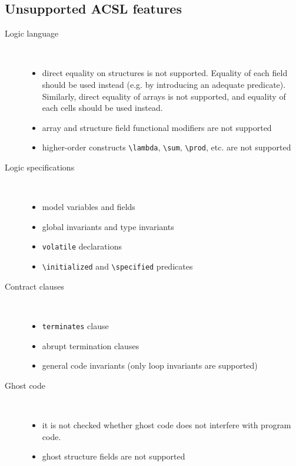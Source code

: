 \documentclass[a4paper,11pt,twoside,openright]{report}
\begin{document}
\subsection{Unsupported ACSL features}

\begin{description}
\item[Logic language] ~\\
  \begin{itemize}
  \item direct equality on structures is not supported. Equality of
    each field should be used instead (e.g. by introducing an adequate
    predicate). Similarly, direct equality of arrays is not supported,
    and equality of each cells should be used instead.
  \item array and structure field functional modifiers are not supported
  \item higher-order constructs \verb|\lambda|, \verb|\sum|,
    \verb|\prod|, etc. are not supported
  \end{itemize}
\item[Logic specifications] ~\\
  \begin{itemize}
  \item model variables and fields
  \item global invariants and type invariants
  \item \verb|volatile| declarations
  \item \verb|\initialized| and \verb|\specified| predicates
  \end{itemize}
\item[Contract clauses] ~\\
  \begin{itemize}
  \item \texttt{terminates} clause
  \item abrupt termination clauses
  \item general code invariants (only loop invariants are supported)
  \end{itemize}
\item[Ghost code] ~\\
  \begin{itemize}
  \item it is not checked whether ghost code does not interfere with
    program code.
  \item ghost structure fields are not supported
  \end{itemize}

\end{description}
\end{document}
